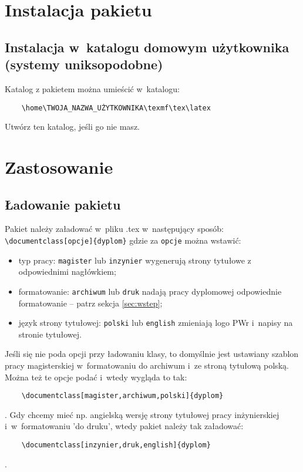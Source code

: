 \documentclass[12pt,a4paper]{article}
\begin{document}
\section{Instalacja pakietu}
\subsection{Instalacja w~katalogu domowym użytkownika (systemy uniksopodobne)}
Katalog z pakietem można umieścić w~katalogu:
\begin{verbatim}
    \home\TWOJA_NAZWA_UŻYTKOWNIKA\texmf\tex\latex
\end{verbatim}
Utwórz ten katalog, jeśli go nie masz.

\section{Zastosowanie}
\subsection{Ładowanie pakietu}
\par Pakiet należy załadować w~pliku .tex w~następujący sposób:\\
\verb|\documentclass[opcje]{dyplom}| gdzie za \verb|opcje| można wstawić:
\begin{itemize}
    \item typ pracy: \verb|magister| lub \verb|inzynier| wygenerują strony tytułowe z odpowiednimi nagłówkiem;
    \item formatowanie: \verb|archiwum| lub \verb|druk| nadają pracy dyplomowej odpowiednie formatowanie -- patrz sekcja \ref{sec:wstep};
    \item język strony tytułowej: \verb|polski| lub \verb|english| zmieniają logo PWr i~napisy na stronie tytułowej.
\end{itemize}
Jeśli się nie poda opcji przy ładowaniu klasy, to domyślnie jest ustawiany szablon pracy magisterskiej w~formatowaniu do archiwum i~ze stroną tytułową polską.
Można też te opcje podać i~wtedy wygląda to tak:
\begin{verbatim}
    \documentclass[magister,archiwum,polski]{dyplom}
\end{verbatim}.
Gdy chcemy mieć np. angielską wersję strony tytułowej pracy inżynierskiej i~w~formatowaniu 'do druku', wtedy pakiet należy tak załadować:
\begin{verbatim}
    \documentclass[inzynier,druk,english]{dyplom}
\end{verbatim}.
\end{document}

